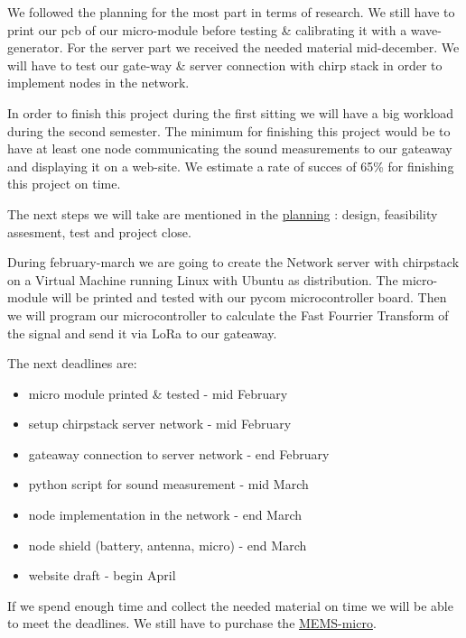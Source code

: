 We followed the planning for the most part in terms of research. We still have to print our pcb of our micro-module before testing \& calibrating it with a wave-generator.
For the server part we received the needed material mid-december. We will have to test our gate-way \& server connection with chirp stack in order to implement nodes in the network.

In order to finish this project during the first sitting we will have a big workload during the second semester. The minimum for finishing this project would be to have at least one node communicating the sound measurements to our gateaway and displaying it on a web-site. We estimate a rate of succes of 65\% for finishing this project on time.

The next steps we will take are mentioned in the \href{https://docs.google.com/spreadsheets/d/1MnJvkWRLTGnZnVPzwmWV14atqugAE_Fr8enjzExGkms/edit?usp=sharing}{planning} : design, feasibility assesment, test and project close.

During february-march we are going to create the Network server with chirpstack on a Virtual Machine running Linux with Ubuntu as distribution. The micro-module will be printed and tested with our pycom microcontroller board. Then we will program our microcontroller to calculate the Fast Fourrier Transform of the signal and send it via LoRa to our gateaway.


The next deadlines are:
\begin{itemize}
  \item[\ding{43}] micro module printed \& tested - mid February
  \item[\ding{43}] setup chirpstack server network - mid February
  \item[\ding{43}] gateaway connection to server network - end February 
  \item[\ding{43}] python script for sound measurement - mid March
  \item[\ding{43}] node implementation in the network - end March
  \item[\ding{43}] node shield (battery, antenna, micro) - end March
  \item[\ding{43}] website draft - begin April
\end{itemize}

If we spend enough time and collect the needed material on time we will be able to meet the deadlines. We still have to purchase the \href{https://www.digikey.be/en/products/detail/pui-audio-inc/DMM-4026-B-I2S-R/11587483}{MEMS-micro}.

